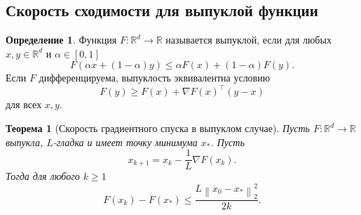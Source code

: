 \documentclass[12pt,a4paper]{article}
\theoremstyle{plain}
\newtheorem{theorem}{Теорема}[section]
\theoremstyle{definition}
\newtheorem{definition}{Определение}[section]
\theoremstyle{remark}
\newcommand{\R}{\mathbb{R}}
\newcommand{\norm}[1]{\left\lVert #1 \right\rVert}
\begin{document}
\subsection{Скорость сходимости для выпуклой функции}

\begin{definition}
Функция $F\colon\R^d\to\R$ называется выпуклой, если для любых
$x,y\in\R^d$ и $\alpha\in[0,1]$
\[
    F(\alpha x+(1-\alpha)y)
    \leq
    \alpha F(x)+(1-\alpha)F(y).
\]
Если $F$ дифференцируема, выпуклость эквивалентна условию
\[
    F(y)
    \geq
    F(x)+\nabla F(x)^\top(y-x)
\]
для всех $x,y$.
\end{definition}

\begin{theorem}[Скорость градиентного спуска в выпуклом случае]
Пусть $F\colon\R^d\to\R$ выпукла, $L$-гладка и имеет точку
минимума $x_*$. Пусть
\[
    x_{k+1}
    =
    x_k-\frac{1}{L}\nabla F(x_k).
\]
Тогда для любого $k\geq 1$
\[
    F(x_k)-F(x_*)
    \leq
    \frac{
        L\norm{x_0-x_*}_2^2
    }{
        2k
    }.
\]
\end{theorem}
\end{document}

